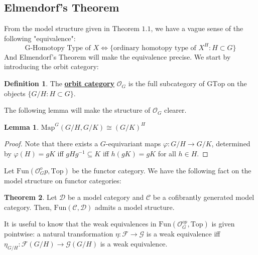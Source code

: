 \documentclass{article}
\theoremstyle{definition}
\newtheorem{theorem}{Theorem}[section]
\theoremstyle{definition}
\newtheorem{definition}{Definition}[theorem]
\theoremstyle{definition}
\theoremstyle{definition}
\theoremstyle{definition}
\newtheorem{lemma}[theorem]{Lemma}
\theoremstyle{definition}
\theoremstyle{definition}
\begin{document}
\subsection{Elmendorf's Theorem}
From the model structure given in Theorem $1.1$, we have a vague sense of the following "equivalence":
\[\textrm{G-Homotopy Type of } X\Leftrightarrow \{ \textrm{ordinary homotopy type of } X^H:H\subset G \}\]
And Elmendorf's Theorem will make the equivalence precise. We start by introducing the orbit category:

\begin{tcolorbox}[colback=purple!5!white,colframe=purple!75!black]
\begin{definition}
The \underline{\textbf{orbit category}} $\mathcal{O}_G$ is the full subcategory of $\textrm{GTop}$ on the objects $\{G/H: H\subset G\}$.
\end{definition}
\end{tcolorbox}
The following lemma will make the structure of $\mathcal{O}_G$ clearer.

\begin{tcolorbox}
\begin{lemma}
$\textrm{Map}^G(G/H,G/K)\cong (G/K)^H$
\end{lemma}
\end{tcolorbox}
\begin{proof}
    Note that there exists a $G$-equivariant maps $\varphi: G/H\to G/K$, determined by $\varphi(H)=gK$ iff $gHg^{-1}\subseteq K$ iff $h(gK)=gK$ for all $h\in H$. 
\end{proof}

Let $\textrm{Fun}(\mathcal{O}_G^op,\textrm{Top})$ be the functor category. We have the following fact on the model structure on functor categories:

\begin{tcolorbox}[colback=red!5!white,colframe=red!30!white]
\begin{theorem}
Let $\mathcal{D}$ be a model category and $\mathcal{C}$ be a cofibrantly generated model category. Then, $\textrm{Fun}(\mathcal{C},\mathcal{D})$ admits a model structure. 
\end{theorem}
\end{tcolorbox}

It is useful to know that the weak equivalences in $\textrm{Fun}(\mathcal{O}^{op}_G,\textrm{Top})$ is given pointwise: a natural transformation $\eta: \mathcal{F}\to \mathcal{G}$ is a weak equivalence iff $\eta_{G/H}:\mathcal{F}(G/H)\to \mathcal{G}(G/H) $ is a weak equivalence. 
\end{document}
